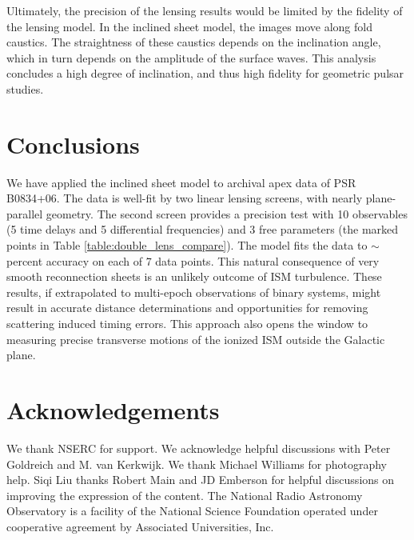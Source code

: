\documentclass[useAMS,usenatbib]{mn2e}
\begin{document}
Ultimately, the precision of the lensing results would be limited by
the fidelity of the lensing model.  In the inclined sheet model, the
images move along fold caustics.  The straightness of these caustics
depends on the inclination angle, which in turn depends on the
amplitude of the surface waves.  This analysis concludes a high degree
of inclination, and thus high fidelity for geometric pulsar studies.

\section{Conclusions}

We have applied the inclined sheet model \citep{2014MNRAS.442.3338P} 
to archival apex data of PSR B0834+06.  The data is well-fit by two
linear lensing screens, with nearly plane-parallel geometry.  The
second screen provides a precision test with 10 observables (5 time delays and 5 differential frequencies) and 3 free
parameters (the marked points in Table \ref{table:double_lens_compare}).  The model fits the data to $\sim$ percent accuracy
on each of 7 data points.  
This natural consequence of very smooth
reconnection sheets is an unlikely outcome of ISM turbulence.  These
results, if extrapolated to multi-epoch observations of binary
systems, might result in accurate distance determinations and
opportunities for removing scattering induced timing errors.  This
approach also opens the window to measuring precise transverse motions
of the ionized ISM outside the Galactic plane.


\section{Acknowledgements}

We thank NSERC for support. We acknowledge helpful discussions with
Peter Goldreich and M. van Kerkwijk.  
We thank Michael Williams for photography help.  
Siqi Liu thanks Robert Main and JD Emberson for helpful discussions on
improving the expression of the content.  
The National Radio Astronomy Observatory is a facility of the National Science Foundation operated under cooperative agreement by Associated Universities, Inc.
\end{document}
